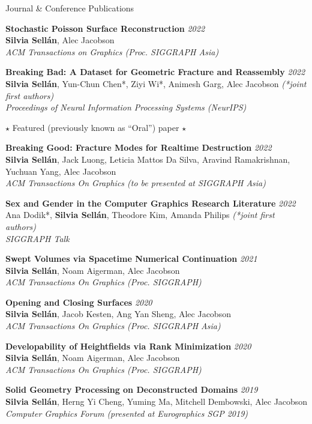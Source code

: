\documentclass{resume}
\newcommand{\publication}[5]{
    {\bf #1} \hfill {\em \small #2} \\ %
    {\small#3}{\small \bf Silvia Sell\'{a}n}{\small #4} \\ %
    {\small \it #5} %
}
\begin{document}
\begin{rSection}{Journal \& Conference Publications}

\publication{Stochastic Poisson Surface Reconstruction}{2022}{}{, Alec Jacobson}{ACM Transactions on Graphics (Proc. SIGGRAPH Asia)}

\publication{Breaking Bad: A Dataset for Geometric Fracture and Reassembly}{2022}{}{*, Yun-Chun Chen*, Ziyi Wi*, Animesh Garg, Alec Jacobson  \textit{(*joint first authors)}}{Proceedings of Neural Information Processing Systems (NeurIPS)}
\newline \small{$\star$ Featured (previously known as ``Oral'') paper $\star$}

\publication{Breaking Good: Fracture Modes for Realtime Destruction}{2022}{}{, Jack Luong, Leticia Mattos Da Silva, Aravind Ramakrishnan, Yuchuan Yang, Alec Jacobson}{ACM Transactions On Graphics (to be presented at SIGGRAPH Asia)}

\publication{Sex and Gender in the Computer Graphics Research Literature}{2022}{Ana Dodik*, }{*, Theodore Kim, Amanda Philips \textit{(*joint first authors)}}{SIGGRAPH Talk}

\publication{Swept Volumes via Spacetime Numerical Continuation}{2021}{}{, Noam Aigerman, Alec Jacobson}{ACM Transactions On Graphics (Proc. SIGGRAPH)}

\publication{Opening and Closing Surfaces}{2020}{}{, Jacob Kesten, Ang Yan Sheng, Alec Jacobson}{ACM Transactions On Graphics (Proc. SIGGRAPH Asia)}

\publication{Developability of Heightfields via Rank Minimization}{2020}{}{, Noam Aigerman, Alec Jacobson}{ACM Transactions On Graphics (Proc. SIGGRAPH)}

\publication{Solid Geometry Processing on Deconstructed Domains}{2019}{}{, Herng Yi Cheng, Yuming Ma, Mitchell Dembowski, Alec Jacobson}{Computer Graphics Forum (presented at Eurographics SGP 2019)}
\end{rSection}
\end{document}
